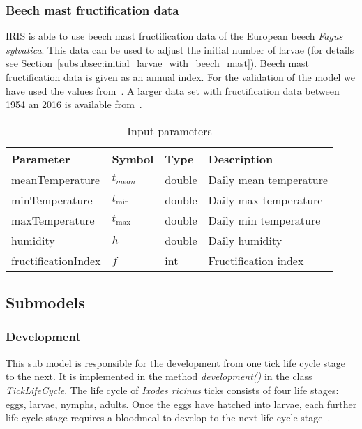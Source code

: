 \documentclass[a4paper, 11pt]{scrartcl}
\begin{document}

\subsubsection{Beech mast fructification data}\label{subsubsec:beech_mast_data}
IRIS is able to use beech mast fructification data of the European beech \textit{Fagus sylvatica}. This data can be used to adjust the initial number of larvae (for details see Section~\ref{subsubsec:initial_larvae_with_beech_mast}). Beech mast fructification data is given as an annual index. For the validation of the model we have used the values from~\cite{Brugger.2018}. A larger data set with fructification data between 1954 an 2016 is available from~\cite{Konnert.2016}.


\begin{table}[h!]
\caption{Input parameters}
\label{tab:input_parameters}
\begin{tabularx}{\textwidth}{llll}
\toprule
\textbf{Parameter} & \textbf{Symbol} & \textbf{Type}     & \textbf{Description}       \\
\midrule
meanTemperature    & $t_{mean}$      & double            & Daily mean temperature     \\
minTemperature     & $t_{\min}$      & double            & Daily max temperature      \\
maxTemperature     & $t_{\max}$      & double            & Daily min temperature      \\
humidity           & $h$             & double            & Daily humidity             \\
\midrule
fructificationIndex & $f$            & int               & Fructification index       \\
\bottomrule
\end{tabularx}
\end{table}


\newpage
\subsection{Submodels}

\subsubsection{Development}
This sub model is responsible for the development from one tick life cycle stage to the next. It is implemented in the method \textit{development()} in the class \textit{TickLifeCycle}. The life cycle of \textit{Ixodes ricinus} ticks consists of four life stages: eggs, larvae, nymphs, adults. Once the eggs have hatched into larvae, each further life cycle stage requires a bloodmeal to develop to the next life cycle stage~\parencite{tba}.
\end{document}
